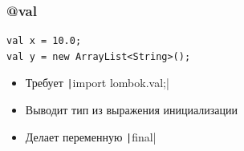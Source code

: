 \documentclass[xetex,mathserif,serif]{beamer}
\begin{document}
	\begin{frame}[fragile]
		\frametitle{@val}
		\begin{verbatim}
val x = 10.0;
val y = new ArrayList<String>();
		\end{verbatim}
		\begin{itemize}
			\item Требует \texttt|import lombok.val;|
			\item Выводит тип из выражения инициализации
			\item Делает переменную \texttt|final|
		\end{itemize}
\end{frame}
\end{document}
